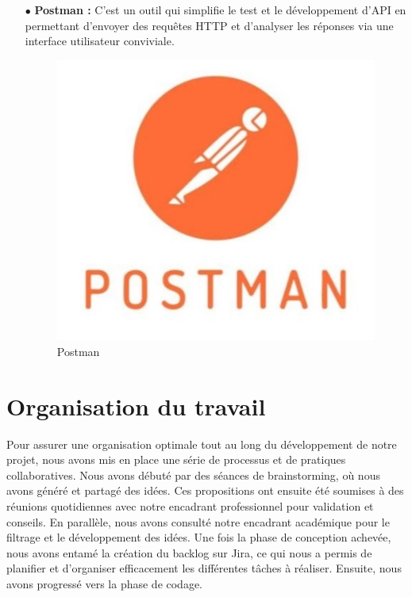 \begin{itemize}
    \item[$\bullet$] \textbf{ Postman :}
          C'est un outil qui simplifie le test et le développement d'API en permettant d'envoyer des requêtes HTTP et d'analyser les réponses via une interface utilisateur conviviale.

          \begin{figure}[H]
              \centering\includegraphics[scale=0.28]{chap1.images/Postman-Logo.jpg}
              \caption{Postman}

          \end{figure}




\end{itemize}


\newpage
\section{Organisation du travail}

Pour assurer une organisation optimale tout au long du développement de notre projet, nous avons mis en place une série de processus et de pratiques collaboratives. Nous avons débuté par des séances de brainstorming, où nous avons généré et partagé des idées. Ces propositions ont ensuite été soumises à des réunions quotidiennes avec notre encadrant professionnel pour validation et conseils. En parallèle, nous avons consulté notre encadrant académique pour le filtrage et le développement des idées. Une fois la phase de conception achevée, nous avons entamé la création du backlog sur Jira, ce qui nous a permis de planifier et d'organiser efficacement les différentes tâches à réaliser. Ensuite, nous avons progressé vers la phase de codage.\\

